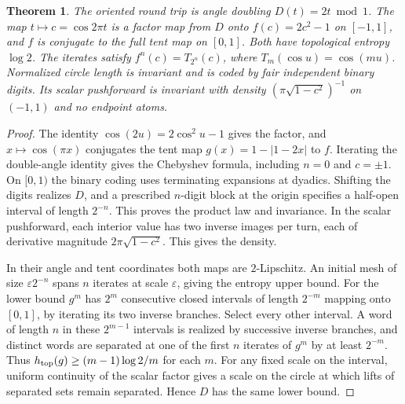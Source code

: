 \documentclass[11pt,reqno]{amsart}
\newtheorem{theorem}{Theorem}[section]
\theoremstyle{definition}
\theoremstyle{remark}
\numberwithin{equation}{section}
\begin{document}
\begin{theorem}\label{m9:doubling}
The oriented round trip is angle doubling \(D(t)=2t\bmod1\). The map
\(t\mapsto c=\cos 2\pi t\) is a factor map from \(D\) onto
\(f(c)=2c^2-1\) on \([-1,1]\), and \(f\) is conjugate to the full tent map on
\([0,1]\). Both have topological entropy \(\log 2\). The iterates satisfy
\(f^n(c)=T_{2^n}(c)\), where \(T_m(\cos u)=\cos(mu)\).
Normalized circle length is invariant and is coded by fair independent
binary digits. Its scalar pushforward is invariant with density
\((\pi\sqrt{1-c^2})^{-1}\) on \((-1,1)\) and no endpoint atoms.
\end{theorem}
\begin{proof}
The identity \(\cos(2u)=2\cos^2u-1\) gives the factor, and
\(x\mapsto\cos(\pi x)\) conjugates the tent map
\(g(x)=1-|1-2x|\) to \(f\). Iterating the double-angle identity gives
the Chebyshev formula, including \(n=0\) and \(c=\pm1\).
On \([0,1)\) the binary coding uses terminating expansions at dyadics.
Shifting the digits realizes \(D\), and a prescribed \(n\)-digit block
at the origin specifies a half-open interval of length \(2^{-n}\).
This proves the product law and invariance. In the scalar pushforward,
each interior value has two inverse images per turn, each of derivative
magnitude \(2\pi\sqrt{1-c^2}\). This gives the density.

In their angle and tent coordinates both maps are \(2\)-Lipschitz.
An initial mesh of size \(\varepsilon 2^{-n}\) spans \(n\) iterates at
scale \(\varepsilon\), giving the entropy upper bound. For the lower
bound \(g^m\) has \(2^m\) consecutive closed intervals of length
\(2^{-m}\) mapping onto \([0,1]\), by iterating its two inverse
branches. Select every other interval. A word of length \(n\) in
these \(2^{m-1}\) intervals is realized by successive inverse
branches, and distinct words are separated at one of the first \(n\)
iterates of \(g^m\) by at least \(2^{-m}\). Thus
\(h_{\rm top}(g)\ge (m-1)\log 2/m\) for each \(m\).
For any fixed scale on the interval, uniform continuity of the
scalar factor gives a scale on the circle at which lifts of separated
sets remain separated. Hence \(D\) has the same lower bound.
\end{proof}
\end{document}
